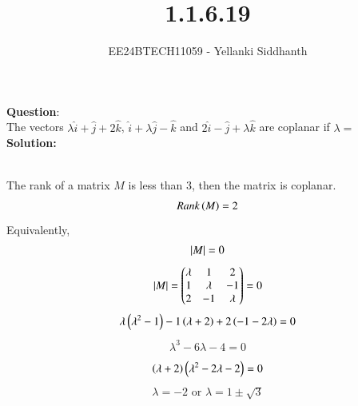 \documentclass[journal]{IEEEtran}
\begin{document}

\vspace{3cm}

\title{1.1.6.19}
\author{EE24BTECH11059 - Yellanki Siddhanth
}
{\let\newpage\relax\maketitle}

\renewcommand{\thefigure}{\theenumi}
\renewcommand{\thetable}{\theenumi}
\setlength{\intextsep}{10pt} %


\renewcommand{\thetable}{\theenumi}


\textbf{Question}:\\

The vectors $\lambda\hat{i} + \hat{j} +2\hat{k}$, $\hat{i} + \lambda\hat{j} - \hat{k}$ and $2\hat{i} - \hat{j} +\lambda\hat{k}$  are coplanar if $\lambda = $
\\ \textbf{Solution: }\\
    \begin{table}[h!]    
      \centering
      
      \caption{}
    \end{table}\\
The rank of a matrix $M$ is less than 3, then the matrix is coplanar. 
    \begin{align}
        Rank\left(M\right) = 2\label{eq1.1.6.19.1}
    \end{align}
Equivalently,
    \begin{align}
        \left\vert M\right\vert = 0 \label{eq1.1.6.19.2}
    \end{align}
    \begin{align}
        \left\vert M\right\vert = \begin{pmatrix}\lambda & 1 & 2 \\ 1 & \lambda & -1 \\ 2 & -1 & \lambda\end{pmatrix} = 0 \label{eq1.1.6.19.3}
    \end{align}
    \begin{align}
        \lambda\left(\lambda^2 - 1\right) - 1\left(\lambda+2\right) + 2\left(-1-2\lambda\right) = 0  \label{eq1.1.6.19.4}
    \end{align}
    \begin{align}
        \lambda^3 - 6\lambda - 4 = 0  \label{eq1.1.6.19.5}
    \end{align}
    \begin{align}
        \left(\lambda + 2\right)\left(\lambda^2 - 2\lambda - 2\right) = 0  \label{eq1.1.6.19.6}
    \end{align}
    \begin{align}
         \lambda = -2 \text{ or } \lambda = 1 \pm \sqrt{3}\label{eq1.1.6.19.6}
    \end{align}
    
\end{document}
